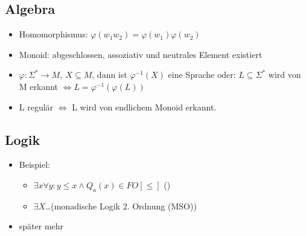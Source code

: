     \subsection{Algebra} %
    \label{sub:intro-algebra}
        \begin{itemize}
            \item Homomorphismus: $\varphi(w_1w_2)=\varphi(w_1)\varphi(w_2)$
            \item Monoid: abgeschlossen, assoziativ und neutrales Element existiert
            \item $\varphi : \Sigma^* \rightarrow M,\ X\subseteq M$, dann ist $\varphi^{-1}(X)$ eine Sprache
            \subitem oder: $L\subseteq \Sigma^*$ wird von M erkannt $\Leftrightarrow L=\varphi^{-1}\left(\varphi\left(L\right)\right)$
            \item L regulär $\Leftrightarrow$ L wird von endlichem Monoid erkannt.
        \end{itemize}
    \subsection{Logik} %
    \label{sub:intro-logik}
        \begin{itemize}
            \item Beispiel:
            \begin{itemize}
                \item $\exists x\forall y: y\le x\wedge Q_a(x) \in FO[\le]$ ()
                \item $\exists X$\dots (monadische Logik 2. Ordnung (MSO))
            \end{itemize}
            \item später mehr
        \end{itemize}
